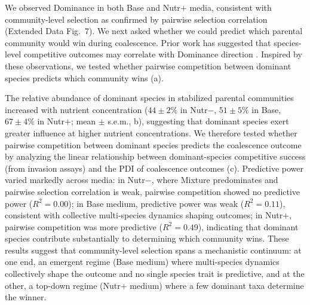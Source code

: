 We observed Dominance in both Base and Nutr$+$ media, consistent with community-level selection as confirmed by pairwise selection correlation (Extended Data Fig.~7). We next asked whether we could predict which parental community would win during coalescence. Prior work has suggested that species-level competitive outcomes may correlate with Dominance direction \citep{Rillig2015, Castledine2020}. Inspired by these observations, we tested whether pairwise competition between dominant species \citep{Hu2022, Ratzke2020} predicts which community wins (a).

The relative abundance of dominant species in stabilized parental communities increased with nutrient concentration ($44 \pm 2\%$ in Nutr$-$, $51 \pm 5\%$ in Base, $67 \pm 4\%$ in Nutr$+$; mean $\pm$ s.e.m., b), suggesting that dominant species exert greater influence at higher nutrient concentrations. We therefore tested whether pairwise competition between dominant species predicts the coalescence outcome by analyzing the linear relationship between dominant-species competitive success (from invasion assays) and the PDI of coalescence outcomes (c). Predictive power varied markedly across media: in Nutr$-$, where Mixture predominates and pairwise selection correlation is weak, pairwise competition showed no predictive power ($R^2 = 0.00$); in Base medium, predictive power was weak ($R^2 = 0.11$), consistent with collective multi-species dynamics shaping outcomes; in Nutr$+$, pairwise competition was more predictive ($R^2 = 0.49$), indicating that dominant species contribute substantially to determining which community wins. These results suggest that community-level selection spans a mechanistic continuum: at one end, an emergent regime (Base medium) where multi-species dynamics collectively shape the outcome and no single species trait is predictive, and at the other, a top-down regime (Nutr$+$ medium) where a few dominant taxa determine the winner. 


